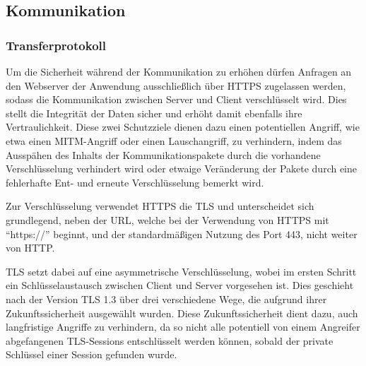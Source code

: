 \subsection{Kommunikation}

\subsubsection{Transferprotokoll}\label{chapter:https}

Um die Sicherheit während der Kommunikation zu erhöhen dürfen Anfragen an den Webserver der Anwendung ausschließlich über \ac{HTTPS} zugelassen werden, sodass  die Kommunikation zwischen Server und Client verschlüsselt wird.
Dies stellt die Integrität der Daten sicher und erhöht damit ebenfalls ihre Vertraulichkeit.
Diese zwei Schutzziele dienen dazu einen potentiellen Angriff, wie etwa einen \ac*{MITM}-Angriff oder einen Lauschangriff, zu verhindern, indem das Ausspähen des Inhalts der Kommunikationspakete durch die vorhandene Verschlüsselung verhindert wird oder etwaige Veränderung der Pakete durch eine fehlerhafte Ent- und erneute Verschlüsselung bemerkt wird.

Zur Verschlüsselung verwendet \ac{HTTPS} die \ac{TLS} und unterscheidet sich grundlegend, neben der \ac{URL}, welche bei der Verwendung von \ac{HTTPS} mit \enquote{https://} beginnt, und der standardmäßigen Nutzung des Port 443, nicht weiter von \ac{HTTP}.

\ac{TLS} setzt dabei auf eine asymmetrische Verschlüsselung, wobei im ersten Schritt ein Schlüsselaustausch zwischen Client und Server vorgesehen ist.
Dies geschieht nach der Version \ac{TLS} 1.3 über drei verschiedene Wege, die aufgrund ihrer Zukunftssicherheit ausgewählt wurden.
Diese Zukunftssicherheit dient dazu, auch langfristige Angriffe zu verhindern, da so nicht alle potentiell von einem Angreifer abgefangenen \ac{TLS}-Sessions entschlüsselt werden können, sobald der private Schlüssel einer Session gefunden wurde.\autocite{rf-RFC8446}
